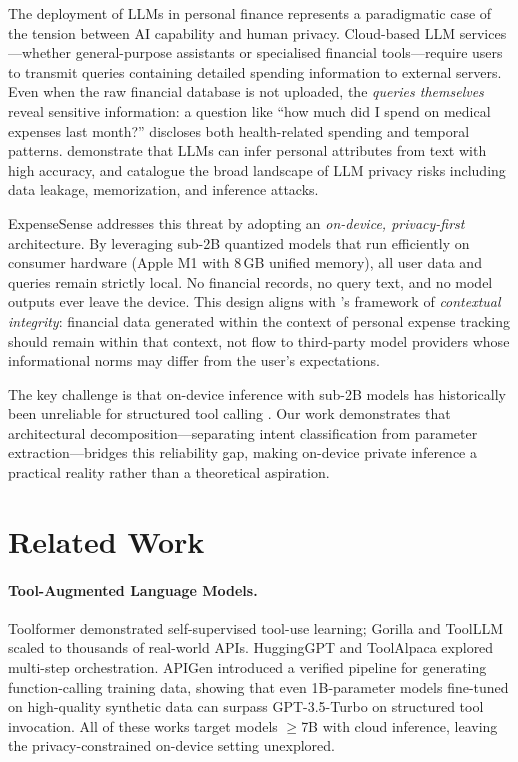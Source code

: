 \documentclass[11pt,twocolumn]{article}
\begin{document}
The deployment of LLMs in personal finance represents a paradigmatic case of the tension between AI capability and human privacy.
Cloud-based LLM services---whether general-purpose assistants or specialised financial tools---require users to transmit queries containing detailed spending information to external servers.
Even when the raw financial database is not uploaded, the \emph{queries themselves} reveal sensitive information: a question like ``how much did I spend on medical expenses last month?'' discloses both health-related spending and temporal patterns.
\citet{staab2024memorization} demonstrate that LLMs can infer personal attributes from text with high accuracy, and \citet{yao2024survey} catalogue the broad landscape of LLM privacy risks including data leakage, memorization, and inference attacks.

ExpenseSense addresses this threat by adopting an \emph{on-device, privacy-first} architecture.
By leveraging sub-2B quantized models that run efficiently on consumer hardware (Apple M1 with 8\,GB unified memory), all user data and queries remain strictly local.
No financial records, no query text, and no model outputs ever leave the device.
This design aligns with \citeauthor{nissenbaum2004privacy}'s framework of \emph{contextual integrity}: financial data generated within the context of personal expense tracking should remain within that context, not flow to third-party model providers whose informational norms may differ from the user's expectations.

The key challenge is that on-device inference with sub-2B models has historically been unreliable for structured tool calling \citep{kavathekar2025small}.
Our work demonstrates that architectural decomposition---separating intent classification from parameter extraction---bridges this reliability gap, making on-device private inference a practical reality rather than a theoretical aspiration.

\section{Related Work}

\paragraph{Tool-Augmented Language Models.}
Toolformer \citep{schick2024toolformer} demonstrated self-supervised tool-use learning; Gorilla \citep{patil2023gorilla} and ToolLLM \citep{qin2023toolllm} scaled to thousands of real-world APIs.
HuggingGPT \citep{shen2024hugginggpt} and ToolAlpaca \citep{tang2024toolalpaca} explored multi-step orchestration.
APIGen \citep{liu2024apigen} introduced a verified pipeline for generating function-calling training data, showing that even 1B-parameter models fine-tuned on high-quality synthetic data can surpass GPT-3.5-Turbo on structured tool invocation.
All of these works target models $\geq$7B with cloud inference, leaving the privacy-constrained on-device setting unexplored.
\end{document}
